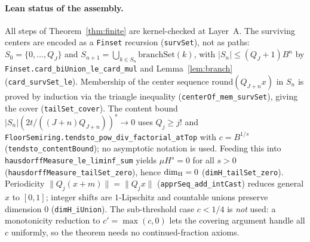 \paragraph{Lean status of the assembly.} All steps of Theorem~\ref{thm:finite}
are kernel-checked at Layer~A. The surviving centers are encoded as a
\texttt{Finset} recursion (\texttt{survSet}), not as paths:
$S_0=\{0,\dots,Q_J\}$ and $S_{n+1}=\bigcup_{k\in S_n}\mathrm{branchSet}(k)$,
with $|S_n|\le(Q_J+1)B^n$ by \texttt{Finset.card\_biUnion\_le\_card\_mul} and
Lemma~\ref{lem:branch} (\texttt{card\_survSet\_le}). Membership of the center
sequence $\mathrm{round}(Q_{J+n}x)$ in $S_n$ is proved by induction via the
triangle inequality (\texttt{centerOf\_mem\_survSet}), giving the cover
(\texttt{tailSet\_cover}). The content bound
$|S_n|(2t/((J+n)Q_{J+n}))^s\to0$ uses $Q_j\ge j!$ and
\texttt{FloorSemiring.\allowbreak tendsto\_pow\_div\_factorial\_atTop} with
$c=B^{1/s}$ (\texttt{tendsto\_contentBound}); no asymptotic notation is used.
Feeding this into \texttt{hausdorffMeasure\_le\_liminf\_sum} yields
$\mu H^s=0$ for all $s>0$ (\texttt{hausdorffMeasure\_tailSet\_zero}), hence
$\dim_{\mathrm{H}}=0$ (\texttt{dimH\_tailSet\_zero}). Periodicity
$\|Q_j(x+m)\|=\|Q_jx\|$ (\texttt{apprSeq\_add\_intCast}) reduces general $x$ to
$[0,1]$; integer shifts are $1$-Lipschitz and countable unions preserve
dimension $0$ (\texttt{dimH\_iUnion}). The sub-threshold case $c<1/4$ is
\emph{not} used: a monotonicity reduction to $c'=\max(c,0)$ lets the covering
argument handle all $c$ uniformly, so the theorem needs no continued-fraction
axioms.

